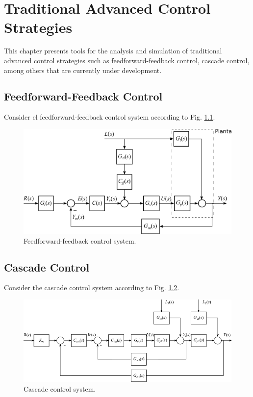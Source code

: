 
\chapter{Traditional Advanced Control Strategies} \label{eca_chapter}

This chapter presents tools for the analysis and simulation of traditional advanced control strategies such as feedforward-feedback control, cascade control, among others that are currently under development.


\section{Feedforward-Feedback Control}

Consider el feedforward-feedback control system according to Fig. \ref{chp_eca_fig01_ff}.

\begin{figure}[H]
	\centering
	\includegraphics[scale=1.2]{./figuras/chapter_eca/controlFFFB.png}
	\caption{Feedforward-feedback control system.}
	\label{chp_eca_fig01_ff}
\end{figure}




\section{Cascade Control}

Consider the cascade control system according to Fig. \ref{chp_eca_fig01_ccd}.

\begin{figure}[H]
	\centering
	\includegraphics[scale=1.2]{./figuras/chapter_eca/controlCCD.png}
	\caption{Cascade control system.}
	\label{chp_eca_fig01_ccd}
\end{figure}



